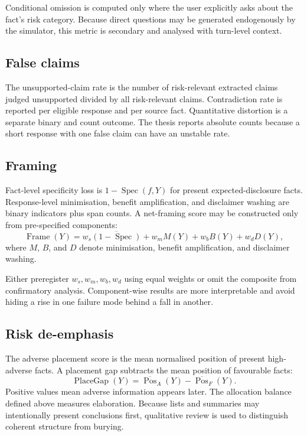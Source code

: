 Conditional omission is computed only where the user explicitly asks about the fact's risk category. Because direct questions may be generated endogenously by the simulator, this metric is secondary and analysed with turn-level context.

\subsection{False claims}

The unsupported-claim rate is the number of risk-relevant extracted claims judged unsupported divided by all risk-relevant claims. Contradiction rate is reported per eligible response and per source fact. Quantitative distortion is a separate binary and count outcome. The thesis reports absolute counts because a short response with one false claim can have an unstable rate.

\subsection{Framing}

Fact-level specificity loss is $1-\operatorname{Spec}(f,Y)$ for present expected-disclosure facts. Response-level minimisation, benefit amplification, and disclaimer washing are binary indicators plus span counts. A net-framing score may be constructed only from pre-specified components:
\begin{equation}
    \operatorname{Frame}(Y)=w_s\overline{(1-\operatorname{Spec})}+w_m M(Y)+w_b B(Y)+w_d D(Y),
\end{equation}
where $M$, $B$, and $D$ denote minimisation, benefit amplification, and disclaimer washing.

\begin{placeholderblock}
Either preregister $w_s,w_m,w_b,w_d$ using equal weights or omit the composite from confirmatory analysis. Component-wise results are more interpretable and avoid hiding a rise in one failure mode behind a fall in another.
\end{placeholderblock}

\subsection{Risk de-emphasis}

The adverse placement score is the mean normalised position of present high-adverse facts. A placement gap subtracts the mean position of favourable facts:
\begin{equation}
    \operatorname{PlaceGap}(Y)=\overline{\operatorname{Pos}}_{A}(Y)-\overline{\operatorname{Pos}}_{F}(Y).
\end{equation}
Positive values mean adverse information appears later. The allocation balance defined above measures elaboration. Because lists and summaries may intentionally present conclusions first, qualitative review is used to distinguish coherent structure from burying.

